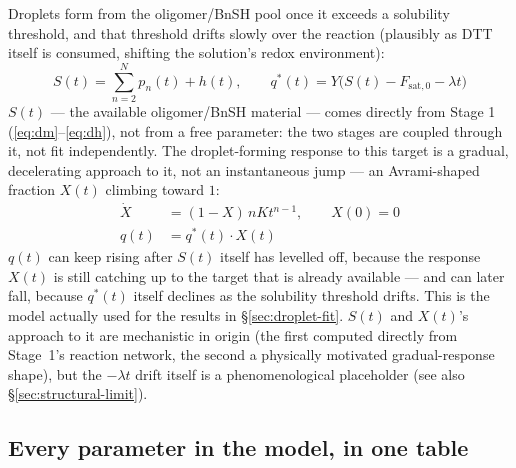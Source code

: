 \documentclass[11pt]{article}
\begin{document}
Droplets form from the oligomer/BnSH pool once it exceeds a solubility threshold, and that
threshold drifts slowly over the reaction (plausibly as DTT itself is consumed, shifting the
solution's redox environment):
\begin{equation}
S(t) = \sum_{n=2}^N p_n(t) + h(t), \qquad
q^*(t) = Y\bigl(S(t) - F_{\mathrm{sat},0} - \lambda t\bigr)
\label{eq:qstar}
\end{equation}
$S(t)$ --- the available oligomer/BnSH material --- comes directly from Stage 1
(\eqref{eq:dm}--\eqref{eq:dh}), not from a free parameter: the two stages are coupled through
it, not fit independently. The droplet-forming response to this target is a gradual,
decelerating approach to it, not an instantaneous jump --- an Avrami-shaped~\cite{Avrami39,
Avrami40,Avrami41} fraction $X(t)$ climbing toward $1$:
\begin{align}
\dot X &= (1-X)\,nKt^{n-1}, \qquad X(0)=0 \label{eq:X}\\
q(t) &= q^*(t)\cdot X(t) \label{eq:q}
\end{align}
$q(t)$ can keep rising after $S(t)$ itself has levelled off, because the response $X(t)$ is
still catching up to the target that is already available --- and can later fall, because
$q^*(t)$ itself declines as the solubility threshold drifts. This is the model actually used
for the results in \S\ref{sec:droplet-fit}. $S(t)$ and $X(t)$'s approach to it are
mechanistic in origin (the first computed directly from Stage~1's reaction network, the second
a physically motivated gradual-response shape), but the $-\lambda t$ drift itself is a
phenomenological placeholder (see also \S\ref{sec:structural-limit}).

\subsection{Every parameter in the model, in one table}
\label{sec:params}
\end{document}
